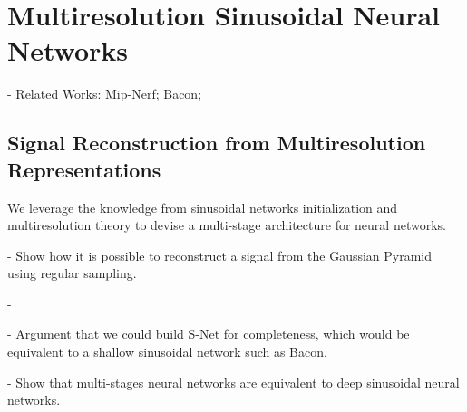 \section{Multiresolution Sinusoidal Neural Networks}

- Related Works: Mip-Nerf; Bacon; 

\subsection{Signal Reconstruction from Multiresolution Representations }

We leverage the knowledge from sinusoidal networks initialization and multiresolution theory to devise a multi-stage architecture for neural networks. 

- Show how it is possible to reconstruct a signal from the Gaussian Pyramid using regular sampling.

- 

- Argument that we could build S-Net for completeness, which would be equivalent to a shallow sinusoidal network such as Bacon.

- Show that multi-stages neural networks are equivalent to deep sinusoidal neural networks.




